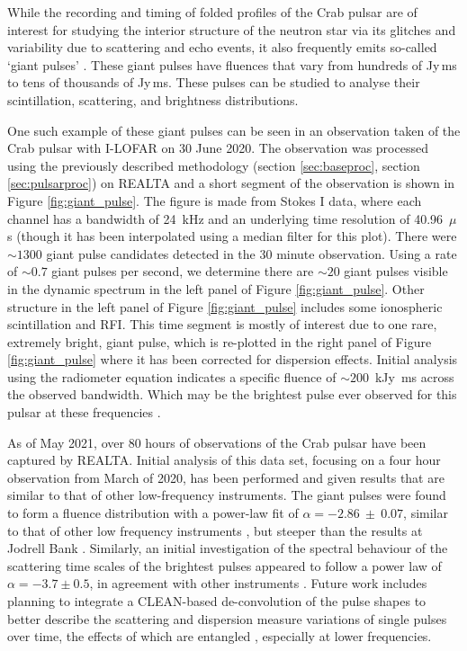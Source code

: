 While the recording and timing of folded profiles of the Crab pulsar are of interest for studying the interior structure of the neutron star via its glitches \citep{Lyne2015} and variability due to scattering and echo events, it also frequently emits so-called `giant pulses' \citep{Meyers2017}. These giant pulses have fluences that vary from hundreds of Jy\,ms to tens of thousands of Jy\,ms. These pulses can be studied to analyse their scintillation, scattering, and brightness distributions.

One such example of these giant pulses can be seen in an observation taken of the Crab pulsar with I-LOFAR on 30 June 2020. The observation was processed using the previously described methodology (section \ref{sec:baseproc}, section \ref{sec:pulsarproc}) on REALTA and a short segment of the observation is shown in Figure \ref{fig:giant_pulse}. The figure is made from Stokes I data, where each channel has a bandwidth of 24~kHz and an underlying time resolution of 40.96~$\mu$s (though it has been interpolated using a median filter for this plot). There were $\sim 1300$ giant pulse candidates detected in the 30 minute observation. Using a rate of $\sim 0.7$ giant pulses per second, we determine there are $\sim 20$ giant pulses visible in the dynamic spectrum in the left panel of Figure \ref{fig:giant_pulse}. Other structure in the left panel of Figure \ref{fig:giant_pulse} includes some ionospheric scintillation and RFI. This time segment is mostly of interest due to one rare, extremely bright, giant pulse, which is re-plotted in the right panel of Figure \ref{fig:giant_pulse} where it has been corrected for dispersion effects. Initial analysis using the radiometer equation indicates a specific fluence of $\sim 200$~kJy~ms across the observed bandwidth. Which may be the brightest pulse ever observed for this pulsar at these frequencies \citep{Karuppusamy2012,Meyers2017,VanLeeuwen2020}.

As of May 2021, over 80 hours of observations of the Crab pulsar have been captured by REALTA. Initial analysis of this data set, focusing on a four hour observation from March of 2020, has been performed and given results that are similar to that of other low-frequency instruments. The giant pulses were found to form a fluence distribution with a power-law fit of $\alpha = -2.86~\pm~0.07$, similar to that of other low frequency instruments \citep{Meyers2017}, but steeper than the results at Jodrell Bank \citep{Mickaliger2017}. Similarly, an initial investigation of the spectral behaviour of the scattering time scales of the brightest pulses appeared to follow a power law of $\alpha = -3.7 \pm 0.5$, in agreement with other instruments \citep{Driessen2019}. Future work includes planning to integrate a CLEAN-based de-convolution \citep[see][]{Bhat2003} of the pulse shapes to better describe the scattering and dispersion measure variations of single pulses over time, the effects of which are entangled \citep{McKee2018}, especially at lower frequencies.

